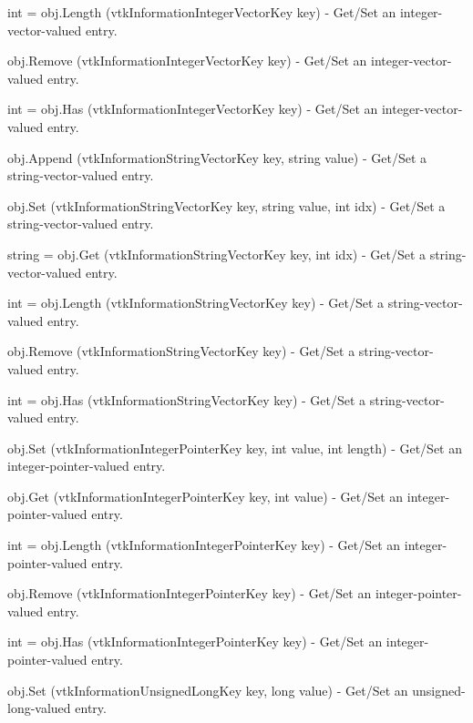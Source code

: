\begin{DoxyItemize}
\item {\ttfamily int = obj.\-Length (vtk\-Information\-Integer\-Vector\-Key key)} -\/ Get/\-Set an integer-\/vector-\/valued entry.  
\item {\ttfamily obj.\-Remove (vtk\-Information\-Integer\-Vector\-Key key)} -\/ Get/\-Set an integer-\/vector-\/valued entry.  
\item {\ttfamily int = obj.\-Has (vtk\-Information\-Integer\-Vector\-Key key)} -\/ Get/\-Set an integer-\/vector-\/valued entry.  
\item {\ttfamily obj.\-Append (vtk\-Information\-String\-Vector\-Key key, string value)} -\/ Get/\-Set a string-\/vector-\/valued entry.  
\item {\ttfamily obj.\-Set (vtk\-Information\-String\-Vector\-Key key, string value, int idx)} -\/ Get/\-Set a string-\/vector-\/valued entry.  
\item {\ttfamily string = obj.\-Get (vtk\-Information\-String\-Vector\-Key key, int idx)} -\/ Get/\-Set a string-\/vector-\/valued entry.  
\item {\ttfamily int = obj.\-Length (vtk\-Information\-String\-Vector\-Key key)} -\/ Get/\-Set a string-\/vector-\/valued entry.  
\item {\ttfamily obj.\-Remove (vtk\-Information\-String\-Vector\-Key key)} -\/ Get/\-Set a string-\/vector-\/valued entry.  
\item {\ttfamily int = obj.\-Has (vtk\-Information\-String\-Vector\-Key key)} -\/ Get/\-Set a string-\/vector-\/valued entry.  
\item {\ttfamily obj.\-Set (vtk\-Information\-Integer\-Pointer\-Key key, int value, int length)} -\/ Get/\-Set an integer-\/pointer-\/valued entry.  
\item {\ttfamily obj.\-Get (vtk\-Information\-Integer\-Pointer\-Key key, int value)} -\/ Get/\-Set an integer-\/pointer-\/valued entry.  
\item {\ttfamily int = obj.\-Length (vtk\-Information\-Integer\-Pointer\-Key key)} -\/ Get/\-Set an integer-\/pointer-\/valued entry.  
\item {\ttfamily obj.\-Remove (vtk\-Information\-Integer\-Pointer\-Key key)} -\/ Get/\-Set an integer-\/pointer-\/valued entry.  
\item {\ttfamily int = obj.\-Has (vtk\-Information\-Integer\-Pointer\-Key key)} -\/ Get/\-Set an integer-\/pointer-\/valued entry.  
\item {\ttfamily obj.\-Set (vtk\-Information\-Unsigned\-Long\-Key key, long value)} -\/ Get/\-Set an unsigned-\/long-\/valued entry.  

\end{DoxyItemize}
